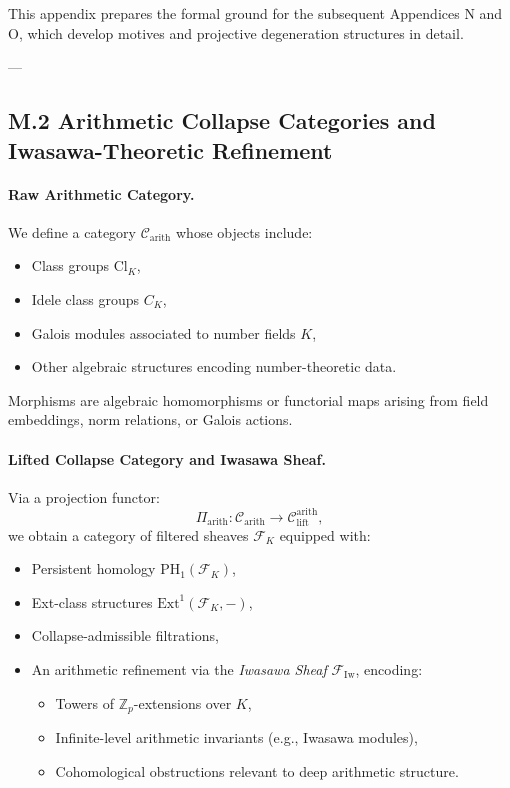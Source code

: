 \documentclass[11pt]{article}
\begin{document}
This appendix prepares the formal ground for the subsequent Appendices N and O, which develop motives and projective degeneration structures in detail.

---

\subsection*{M.2 Arithmetic Collapse Categories and Iwasawa-Theoretic Refinement}

\paragraph{Raw Arithmetic Category.}
We define a category \( \mathcal{C}_{\mathrm{arith}} \) whose objects include:
\begin{itemize}
  \item Class groups \( \mathrm{Cl}_K \),
  \item Idele class groups \( C_K \),
  \item Galois modules associated to number fields \( K \),
  \item Other algebraic structures encoding number-theoretic data.
\end{itemize}

Morphisms are algebraic homomorphisms or functorial maps arising from field embeddings, norm relations, or Galois actions.

\paragraph{Lifted Collapse Category and Iwasawa Sheaf.}
Via a projection functor:
\[
\Pi_{\mathrm{arith}} : \mathcal{C}_{\mathrm{arith}} \longrightarrow \mathcal{C}_{\mathrm{lift}}^{\mathrm{arith}},
\]
we obtain a category of filtered sheaves \( \mathcal{F}_K \) equipped with:
\begin{itemize}
  \item Persistent homology \( \mathrm{PH}_1(\mathcal{F}_K) \),
  \item Ext-class structures \( \mathrm{Ext}^1(\mathcal{F}_K, -) \),
  \item Collapse-admissible filtrations,
  \item An arithmetic refinement via the \emph{Iwasawa Sheaf} \( \mathcal{F}_{\mathrm{Iw}} \), encoding:
    \begin{itemize}
      \item Towers of $\mathbb{Z}_p$-extensions over \( K \),
      \item Infinite-level arithmetic invariants (e.g., Iwasawa modules),
      \item Cohomological obstructions relevant to deep arithmetic structure.
    \end{itemize}
\end{itemize}
\end{document}

